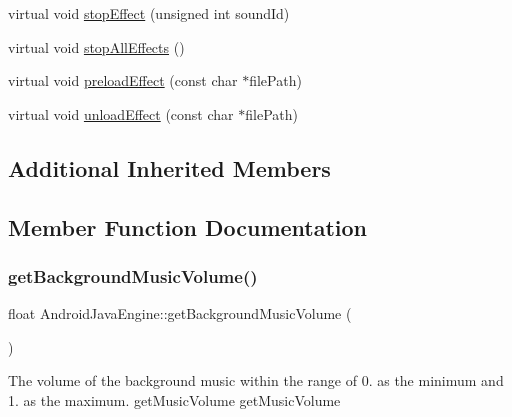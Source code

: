 \begin{DoxyCompactItemize}
virtual void \hyperlink{classCocosDenshion_1_1android_1_1AndroidJavaEngine_ad8b01c7f29f3536fdb509b00678f6156}{stop\+Effect} (unsigned int sound\+Id)
\item 
virtual void \hyperlink{classCocosDenshion_1_1android_1_1AndroidJavaEngine_a799f2f5d4f50aacfd975e5983f46bbed}{stop\+All\+Effects} ()
\item 
virtual void \hyperlink{classCocosDenshion_1_1android_1_1AndroidJavaEngine_aa863dece58028ea4877b1215a5a9bd7c}{preload\+Effect} (const char $\ast$file\+Path)
\item 
virtual void \hyperlink{classCocosDenshion_1_1android_1_1AndroidJavaEngine_a7d11887670799c98fdeb2b7ece2efad9}{unload\+Effect} (const char $\ast$file\+Path)
\end{DoxyCompactItemize}
\subsection*{Additional Inherited Members}


\subsection{Member Function Documentation}
\mbox{\label{classCocosDenshion_1_1android_1_1AndroidJavaEngine_ab9c6ae5e936cb51283f804e163947e2c}} 
\subsubsection{\texorpdfstring{get\+Background\+Music\+Volume()}{getBackgroundMusicVolume()}\hspace{0.1cm}{\footnotesize\ttfamily [1/2]}}
{\footnotesize\ttfamily float Android\+Java\+Engine\+::get\+Background\+Music\+Volume (\begin{DoxyParamCaption}{ }\end{DoxyParamCaption})\hspace{0.3cm}{\ttfamily [virtual]}}

The volume of the background music within the range of 0. as the minimum and 1. as the maximum.  get\+Music\+Volume  get\+Music\+Volume 

